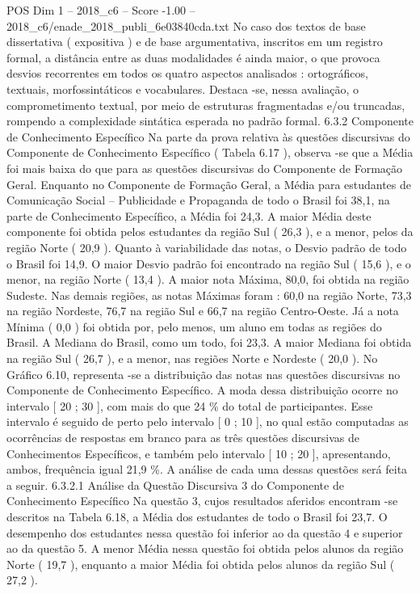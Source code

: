 \begin{textsample}{POS Dim 1 – 2018\_c6 – Score -1.00 – 2018\_c6/enade\_2018\_publi\_6e03840cda.txt}
No caso dos textos de base dissertativa ( expositiva ) e de base argumentativa, inscritos em um registro formal, a distância entre as duas modalidades é ainda maior, o que provoca desvios recorrentes em todos os quatro aspectos analisados : ortográficos, textuais, morfossintáticos e vocabulares.
Destaca -se, nessa avaliação, o comprometimento textual, por meio de estruturas fragmentadas e/ou truncadas, rompendo a complexidade sintática esperada no padrão formal. 6.3.2 Componente de Conhecimento Específico Na parte da prova relativa às questões discursivas do Componente de Conhecimento Específico ( Tabela 6.17 ), observa -se que a Média foi mais baixa do que para as questões discursivas do Componente de Formação Geral.
Enquanto no Componente de Formação Geral, a Média para estudantes de Comunicação Social – Publicidade e Propaganda de todo o Brasil foi 38,1, na parte de Conhecimento Específico, a Média foi 24,3.
A maior Média deste componente foi obtida pelos estudantes da região Sul ( 26,3 ), e a menor, pelos da região Norte ( 20,9 ).
Quanto à variabilidade das notas, o Desvio padrão de todo o Brasil foi 14,9.
O maior Desvio padrão foi encontrado na região Sul ( 15,6 ), e o menor, na região Norte ( 13,4 ).
A maior nota Máxima, 80,0, foi obtida na região Sudeste.
Nas demais regiões, as notas Máximas foram : 60,0 na região Norte, 73,3 na região Nordeste, 76,7 na região Sul e 66,7 na região Centro-Oeste.
Já a nota Mínima ( 0,0 ) foi obtida por, pelo menos, um aluno em todas as regiões do Brasil.
A Mediana do Brasil, como um todo, foi 23,3.
A maior Mediana foi obtida na região Sul ( 26,7 ), e a menor, nas regiões Norte e Nordeste ( 20,0 ).
No Gráfico 6.10, representa -se a distribuição das notas nas questões discursivas no Componente de Conhecimento Específico.
A moda dessa distribuição ocorre no intervalo [ 20 ; 30 ], com mais do que 24 \% do total de participantes.
Esse intervalo é seguido de perto pelo intervalo [ 0 ; 10 ], no qual estão computadas as ocorrências de respostas em branco para as três questões discursivas de Conhecimentos Específicos, e também pelo intervalo [ 10 ; 20 ], apresentando, ambos, frequência igual 21,9 \%.
A análise de cada uma dessas questões será feita a seguir. 6.3.2.1 Análise da Questão Discursiva 3 do Componente de Conhecimento Específico Na questão 3, cujos resultados aferidos encontram -se descritos na Tabela 6.18, a Média dos estudantes de todo o Brasil foi 23,7.
O desempenho dos estudantes nessa questão foi inferior ao da questão 4 e superior ao da questão 5.
A menor Média nessa questão foi obtida pelos alunos da região Norte ( 19,7 ), enquanto a maior Média foi obtida pelos alunos da região Sul ( 27,2 ).

\end{textsample}
